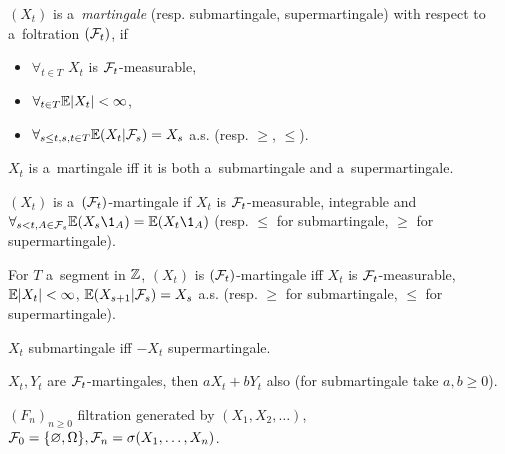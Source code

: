 	\begin{definition}[martingale]
		$(X_t)$ is a~\emph{martingale} (resp. submartingale, supermartingale)
		with respect to a~foltration $(\mathcal{F}_t)$, if 
		\begin{itemize}
			\item $\forall_{t \in T}$ $X_t$ is $\mathcal{F}_t$-measurable,
			\item $\forall_{t \in T} \mathbb{E} |X_t| < \infty$,
			\item $\forall_{s \leq t, s, t \in T} \mathbb{E}(X_t | \mathcal{F}_s) = X_s$ a.s. (resp. $\geq$, $\leq$).
		\end{itemize}
	\end{definition}
	
	\begin{remark}
		$X_t$ is a~martingale iff it is both a~submartingale and a~supermartingale.
	\end{remark}
	
	\begin{remark}
		$(X_t)$ is a~$(\mathcal{F}_t)$-martingale if $X_t$ is $\mathcal{F}_t$-measurable, integrable and $\forall_{s < t, A \in \F_s} \E(X_s \1_A) = \E(X_t \1_A)$ (resp. $\leq$ for submartingale, $\geq$ for supermartingale).
	\end{remark}
	
	\begin{remark}
		For $T$ a~segment in ${\mathbb{Z}}$, $(X_t)$ is $(\mathcal{F}_t)$-martingale iff
		$X_t$ is $\mathcal{F}_t$-measurable, $\mathbb{E}|X_t|<\infty$, $\mathbb{E}(X_{s+1} | \mathcal{F}_s) = X_s$ a.s. (resp. $\geq$ for submartingale, $\leq$ for supermartingale).
	\end{remark}
	
	\begin{remark}
		$X_t$ submartingale iff $-X_t$ supermartingale.
	\end{remark}
	
	\begin{remark}
		$X_t, Y_t$ are $\mathcal{F}_t$-martingales, then $a X_t + b Y_t$ also (for submartingale take $a, b \geq 0$).
	\end{remark}
	
	\begin{definition}
		$(F_n)_{n \geq 0}$ filtration generated by $(X_1, X_2, \ldots)$, $\mathcal{F}_0 = \{ \varnothing, \Omega\}, \mathcal{F}_n = \sigma(X_1, \ldots, X_n)$.
	\end{definition}












 
 
